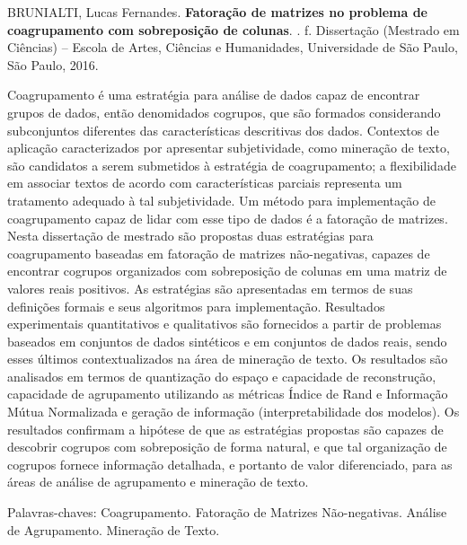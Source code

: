 \documentclass[
    12pt,                %
    oneside,            %
    a4paper,            %
    english,            %
    brazil                %
    ]{abntex2ppgsi}
\begin{document}
\setlength{\absparsep}{18pt} %
\begin{resumo}

%
%
%
%
\begin{flushleft}
BRUNIALTI, Lucas Fernandes. \textbf{Fatoração de matrizes no problema de coagrupamento com sobreposição de colunas}. \imprimirdata. \pageref{LastPage} f. Dissertação (Mestrado em Ciências) – Escola de Artes, Ciências e Humanidades, Universidade de São Paulo, São Paulo, 2016.
\end{flushleft}

Coagrupamento é uma estratégia para análise de dados capaz de encontrar grupos de dados, então denomidados cogrupos, que são formados considerando subconjuntos diferentes das  características descritivas dos dados.
Contextos de aplicação caracterizados por apresentar subjetividade, como mineração de texto, são candidatos a serem submetidos à estratégia de coagrupamento; a flexibilidade em associar textos de acordo com características parciais representa um tratamento adequado à tal subjetividade.
Um método para implementação de coagrupamento capaz de lidar com esse tipo de dados é a fatoração de matrizes.
Nesta dissertação de mestrado são propostas duas estratégias para coagrupamento baseadas em fatoração de matrizes não-negativas, capazes de encontrar cogrupos organizados com sobreposição de colunas em uma matriz de valores reais positivos.
As estratégias são apresentadas em termos de suas definições formais e seus algoritmos para implementação.
Resultados experimentais quantitativos e qualitativos são fornecidos a partir de problemas baseados em conjuntos de dados sintéticos e em conjuntos de dados reais, sendo esses últimos contextualizados na área de mineração de texto.
Os resultados são analisados em termos de quantização do espaço e capacidade de reconstrução, capacidade de agrupamento utilizando as métricas Índice de Rand e Informação Mútua Normalizada e geração de informação (interpretabilidade dos modelos).
Os resultados confirmam a hipótese de que as estratégias propostas são capazes de descobrir cogrupos com sobreposição de forma natural, e que tal organização de cogrupos fornece informação detalhada, e portanto de valor diferenciado, para as áreas de análise de agrupamento e mineração de texto.

Palavras-chaves: Coagrupamento. Fatoração de Matrizes Não-negativas. Análise de Agrupamento. Mineração de Texto.
\end{resumo}
\end{document}
